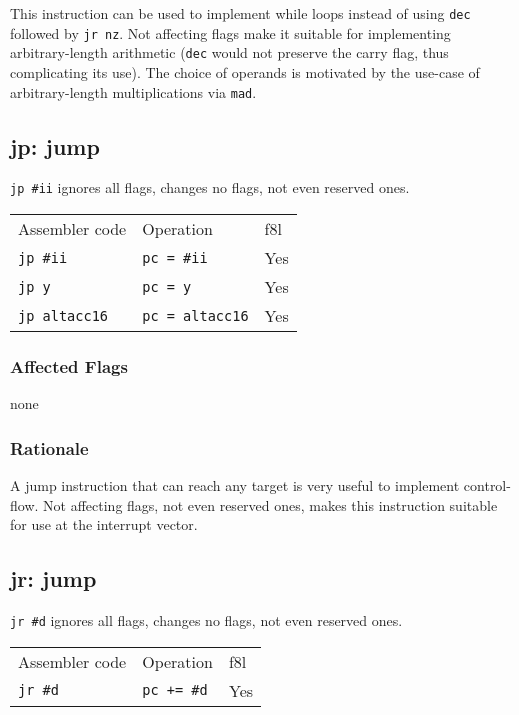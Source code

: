 \documentclass{book}
\begin{document}
This instruction can be used to implement while loops instead of using \texttt{dec} followed by \texttt{jr nz}. Not affecting flags make it suitable for implementing arbitrary-length arithmetic (\texttt{dec} would not preserve the carry flag, thus complicating its use). The choice of operands is motivated by the use-case of arbitrary-length multiplications via \texttt{mad}.


\subsection{jp: jump}

\texttt{jp \#ii} ignores all flags, changes no flags, not even reserved ones.

\begin{tabular}{l l l}
Assembler code       & Operation              & f8l \\
\texttt{jp \#ii}     & \texttt{pc = \#ii}     & Yes \\
\texttt{jp y}        & \texttt{pc = y}        & Yes \\
\texttt{jp altacc16} & \texttt{pc = altacc16} & Yes \\
\end{tabular}

\subsubsection*{Affected Flags}

none

\subsubsection*{Rationale}

A jump instruction that can reach any target is very useful to implement control-flow. Not affecting flags, not even reserved ones, makes this instruction suitable for use at the interrupt vector.


\subsection{jr: jump}

\texttt{jr \#d} ignores all flags, changes no flags, not even reserved ones.

\begin{tabular}{l l l}
Assembler code  & Operation          & f8l \\
\texttt{jr \#d} & \texttt{pc += \#d} & Yes \\
\end{tabular}
\end{document}
